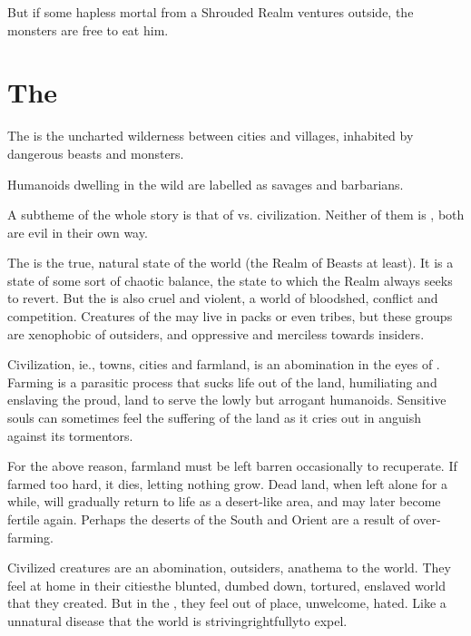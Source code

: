 But if some hapless mortal from a Shrouded Realm ventures outside, the monsters are free to eat him. 














\section{The \Wylde}
The \Wylde{} is the uncharted wilderness between cities and villages, inhabited by dangerous beasts and monsters. 

Humanoids dwelling in the wild are labelled as savages and barbarians. 

A subtheme of the whole story is that of \Wylde{} vs. civilization. Neither of them is , both are evil in their own way. 

The \Wylde{} is the true, natural state of the world (the Realm of Beasts at least). 
It is a state of some sort of chaotic balance, the state to which the Realm always seeks to revert. 
But the \Wylde{} is also cruel and violent, a world of bloodshed, conflict and competition. 
Creatures of the \Wylde{} may live in packs or even tribes, but these groups are xenophobic of outsiders, and oppressive and merciless towards insiders. 

Civilization, ie., towns, cities and farmland, is an abomination in the eyes of . 
Farming is a parasitic process that sucks life out of the land, humiliating and enslaving the proud, \Wylde{} land to serve the lowly but arrogant humanoids. 
Sensitive souls can sometimes feel the suffering of the land as it cries out in anguish against its tormentors. 

For the above reason, farmland must be left barren occasionally to recuperate. 
If farmed too hard, it dies, letting nothing grow. 
Dead land, when left alone for a while, will gradually return to life as a \Wylde{} desert-like area, and may later become fertile again. 
Perhaps the deserts of the South and Orient are a result of over-farming. 

Civilized creatures are an abomination, outsiders, anathema to the world. 
They feel at home in their cities\dash the blunted, dumbed down, tortured, enslaved world that they created. 
But in the \Wylde{}, they feel out of place, unwelcome, hated. 
Like a unnatural disease that the world is striving\dash rightfully\dash to expel.


